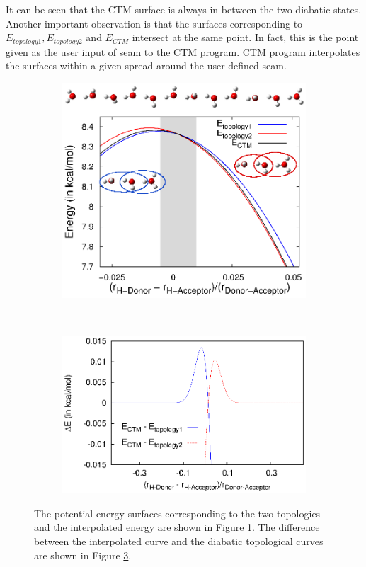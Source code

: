 It can be seen that the CTM surface is always in between the two diabatic states.
Another important observation is that the surfaces corresponding to
$E_{topology1}, E_{topology2}$ and $E_{CTM}$ intersect at the same point. In fact, this
is the point given as the user input of seam to the CTM program. CTM program
interpolates the surfaces within a given spread around the user defined seam.

\begin{figure}[hbt!]
    \centering
    \begin{subfigure}[t]{0.5\textwidth}
        \centering
        \includegraphics[width=1\textwidth]{figures/twoTopoWithWaterwireChanged.eps}
        \caption{\label{chap3fig1}}
    \end{subfigure}%
    ~
    \begin{subfigure}[t]{0.5\textwidth}
        \centering
        \includegraphics[width=1\textwidth]{figures/DiffERepeated.eps}
        \caption{\label{chap3fig2}}
    \end{subfigure}
    \caption{The potential energy surfaces corresponding to the two topologies and the interpolated
    energy are shown in Figure \ref{chap3fig1}. The difference between the
    interpolated curve and the diabatic topological curves are shown in Figure \ref{chap3fig2}.}
\end{figure}

